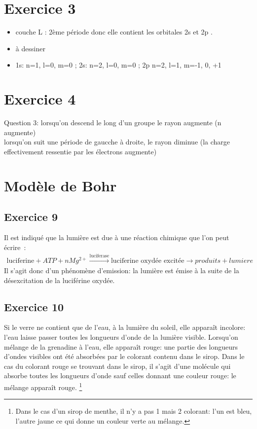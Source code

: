 \documentclass[12pt,french,dvips]{report}
\begin{document}
\section{Exercice 3}
\begin{itemize}
\item couche L : 2ème période donc elle contient les orbitales 2s \fbox{\phantom{$\uparrow\downarrow$}}
et 2p\fbox{\phantom{$\uparrow\downarrow$}}\fbox{\phantom{$\uparrow\downarrow$}}\fbox{\phantom{$\uparrow\downarrow$}}  .
\item à dessiner
\item 1s: n=1, l=0, m=0 ; 2s: n=2, l=0, m=0 ; 2p n=2, l=1, m={-1, 0, +1}
\end{itemize}

\section{Exercice 4}
Question 3: lorsqu'on descend le long d'un groupe le rayon augmente (n augmente)\\
            lorsqu'on suit une période de gaucche à droite, le rayon diminue (la charge effectivement
            ressentie par les électrons augmente)
\newpage
\section{Modèle de Bohr}
\subsection{Exercice 9}
Il est indiqué que la lumière est due à une réaction chimique que l'on peut écrire~:
\begin{align*}
\text{luciferine} + ATP + n Mg^{2+} \xrightarrow{\text{luciferase}} \text{luciferine oxydée excitée} \rightarrow produits + lumiere
\end{align*}
Il s'agit donc d'un phénomène d'emission: la lumière est émise à la suite de la désexcitation
de la luciférine oxydée.
\subsection{Exercice 10}
Si le verre ne contient que de l'eau, à la lumière du soleil, elle apparaît incolore: l'eau laisse
passer toutes les longueurs d'onde de la lumière visible.
Lorsqu'on mélange de la grenadine à l'eau, elle apparaît rouge: une partie des longueurs
d'ondes visibles ont été absorbées par le colorant contenu dans le sirop.
Dans le cas du colorant rouge se trouvant dans le sirop, il s'agit d'une molécule
qui absorbe toutes les longueurs d'onde sauf celles donnant une couleur rouge: le mélange apparaît rouge.%
\footnote{Dans le cas d'un sirop de menthe, il n'y a pas 1 mais 2 colorant: l'un est bleu, l'autre jaune
ce qui donne un couleur verte au mélange.}
\end{document}
